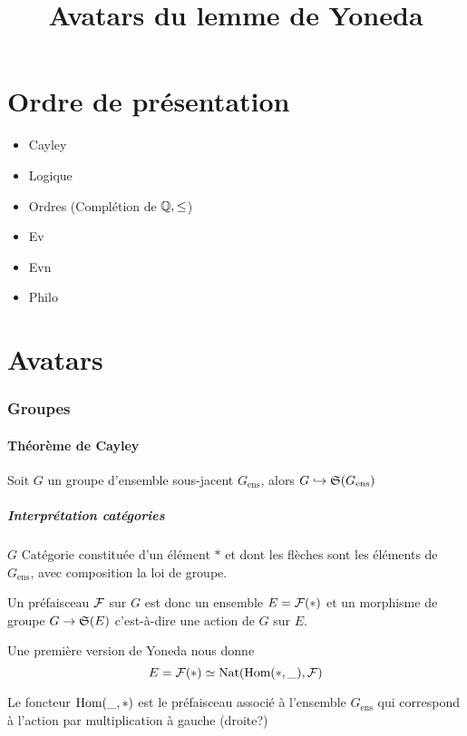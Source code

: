 \documentclass[12pt,makeidx, draft]{amsart}
\title{Avatars du lemme de Yoneda}
\DeclareMathOperator\Nat{\text{Nat}}
\begin{document}
\maketitle


\part{Ordre de présentation}
\begin{itemize}
\item Cayley
\item Logique
\item Ordres (Complétion de $\mathbb{Q},\leq$)
\item Ev
\item Evn
\item Philo
\end{itemize}

\part{Avatars}
\section{Groupes}

\subsection{Théorème de Cayley}
Soit $G$ un groupe d'ensemble sous-jacent $G_{\text{ens}}$, alors
$G \hookrightarrow \operatorname{\mathfrak{S}}(G_{\text{ens}})$


\subsubsection{Interprétation catégories}
$G$ Catégorie constituée d'un élément $*$ et dont les flèches sont les éléments de $G_{\text{ens}}$, avec composition la loi de groupe.

Un préfaisceau $\mathcal{F}$ sur $G$ est donc un ensemble $E = \mathcal{F}(*)$ et un morphisme de groupe $G \to \operatorname{\mathfrak{S}}(E)$ c'est-à-dire une action de $G$ sur $E$.

Une première version de Yoneda nous donne
\begin{equation}
E = \Ff(*) \simeq \Nat(\Hom(*,\_),\Ff)
\end{equation}

Le foncteur $\text{Hom}(\_,*)$ est le préfaisceau associé à l'ensemble $G_{\text{ens}}$ qui correspond à l'action par multiplication à gauche (droite?)
\end{document}
